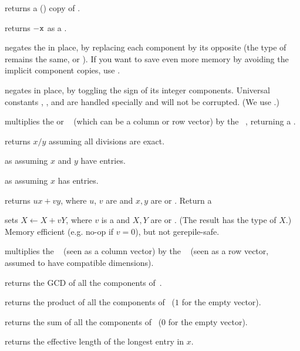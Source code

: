  returns a () copy of .

 returns $-{\tt x}$ as a .

 negates the   in place, by
replacing each component by its opposite (the type of  remains the
same,  or ). If you want to save even more memory by
avoiding the implicit component copies, use .

 negates  in place, by toggling the
sign of its integer components. Universal constants ,
,  and  are handled specially and will
not be corrupted. (We use .)

 multiplies the  or ~
(which can be a column or row vector) by the ~, returning a
.

 returns $x/y$ assuming all divisions
are exact.

 as  assuming $x$
and $y$ have  entries.

 as  assuming $x$
has  entries.

 returns $ux + vy$, where
$u$, $v$ are  and $x,y$ are  or . Return a 

 sets $X\leftarrow X +
vY$, where $v$ is a  and $X,Y$ are  or . (The result
has the type of $X$.) Memory efficient (e.g. no-op if $v = 0$), but not
gerepile-safe.

 multiplies the ~
(seen as a column vector) by the ~ (seen as a row vector,
assumed to have compatible dimensions).

 returns the GCD of all the components
of~.

 returns the product of all the components
of~ ($1$ for the empty vector).

 returns the sum of all the components
of~ ($0$ for the empty vector).

 returns the effective length of the longest
entry in $x$.

